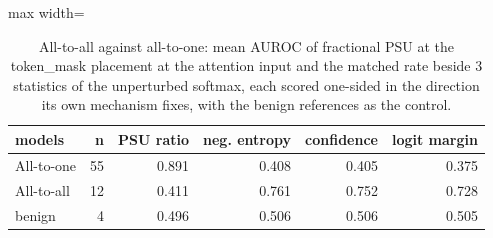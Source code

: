 \begin{table}[htbp]
\centering
\small
\caption{All-to-all against all-to-one: mean AUROC of fractional PSU at the token\_mask placement at the attention input and the matched rate beside 3 statistics of the unperturbed softmax, each scored one-sided in the direction its own mechanism fixes, with the benign references as the control.}
\label{tab:all-to-all}
\begin{adjustbox}{max width=\linewidth}
\begin{tabular}{lrrrrr}
\toprule
models & n & PSU ratio & neg. entropy & confidence & logit margin \\
\midrule
All-to-one & 55 & 0.891 & 0.408 & 0.405 & 0.375 \\
All-to-all & 12 & 0.411 & 0.761 & 0.752 & 0.728 \\
benign & 4 & 0.496 & 0.506 & 0.506 & 0.505 \\
\bottomrule
\end{tabular}
\end{adjustbox}
\end{table}
